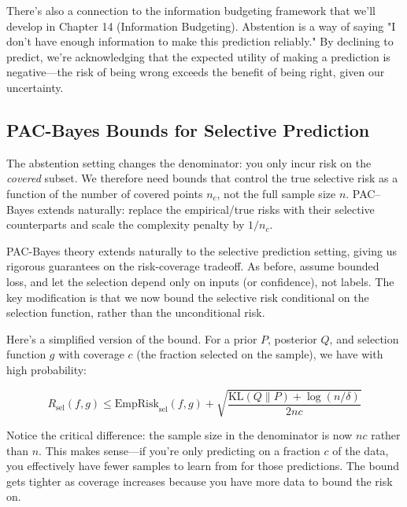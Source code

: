 \vspace{0.3cm}

There's also a connection to the information budgeting framework that we'll develop in Chapter 14 (Information Budgeting). Abstention is a way of saying "I don't have enough information to make this prediction reliably." By declining to predict, we're acknowledging that the expected utility of making a prediction is negative---the risk of being wrong exceeds the benefit of being right, given our uncertainty.

\vspace{1em}

\subsection{PAC-Bayes Bounds for Selective Prediction}
The abstention setting changes the denominator: you only incur risk on the \emph{covered} subset. We therefore need bounds that control the true selective risk as a function of the number of covered points $n_c$, not the full sample size $n$. PAC--Bayes extends naturally: replace the empirical/true risks with their selective counterparts and scale the complexity penalty by $1/n_c$.

\vspace{0.3cm}

PAC-Bayes theory extends naturally to the selective prediction setting, giving us rigorous guarantees on the risk-coverage tradeoff. As before, assume bounded loss, and let the selection depend only on inputs (or confidence), not labels. The key modification is that we now bound the selective risk conditional on the selection function, rather than the unconditional risk.

\vspace{0.3cm}

Here's a simplified version of the bound. For a prior $P$, posterior $Q$, and selection function $g$ with coverage $c$ (the fraction selected on the sample), we have with high probability:

\vspace{0.3cm}

\begin{equation}
R_{\text{sel}}(f,g) \leq \text{EmpRisk}_{\text{sel}}(f,g) + \sqrt{\frac{\text{KL}(Q \| P) + \log(n/\delta)}{2nc}}
\end{equation}

\vspace{0.3cm}

Notice the critical difference: the sample size in the denominator is now $nc$ rather than $n$. This makes sense---if you're only predicting on a fraction $c$ of the data, you effectively have fewer samples to learn from for those predictions. The bound gets tighter as coverage increases because you have more data to bound the risk on.


